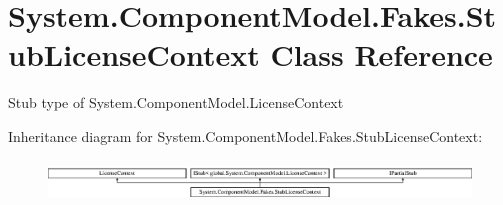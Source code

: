 \hypertarget{class_system_1_1_component_model_1_1_fakes_1_1_stub_license_context}{\section{System.\-Component\-Model.\-Fakes.\-Stub\-License\-Context Class Reference}
\label{class_system_1_1_component_model_1_1_fakes_1_1_stub_license_context}
}


Stub type of System.\-Component\-Model.\-License\-Context 


Inheritance diagram for System.\-Component\-Model.\-Fakes.\-Stub\-License\-Context\-:\begin{figure}[H]
\begin{center}
\leavevmode
\includegraphics[height=1.091618cm]{class_system_1_1_component_model_1_1_fakes_1_1_stub_license_context}
\end{center}
\end{figure}
